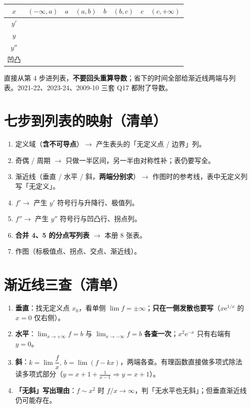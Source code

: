 \documentclass[11pt,a4paper]{ctexart}
\newcommand{\ee}{\mathrm{e}}
\begin{document}
\begin{center}
\footnotesize\setlength{\tabcolsep}{4pt}
\begin{tabular}{@{}c|ccccccc@{}}
$x$ & $(-\infty,a)$ & $a$ & $(a,b)$ & $b$ & $(b,c)$ & $c$ & $(c,+\infty)$ \\
\hline
$y'$ & & & & & & & \\
$y$ & & & & & & & \\
$y''$ & & & & & & & \\
凹凸 & & & & & & & \\
\end{tabular}
\end{center}

\begin{warnbox}[卷面附了 $y',y''$ 时]
直接从第 4 步进列表，\textbf{不要回头重算导数}；省下的时间全部给渐近线两端与列表。2021-22、2023-24、2009-10 三套 Q17 都附了导数。
\end{warnbox}

\section{七步到列表的映射（清单）}

\begin{enumerate}[label=\textbf{第 \arabic* 步},leftmargin=2.6em]
\item 定义域（\textbf{含不可导点}）$\to$ 产生表头的「无定义点 / 边界」列。
\item 奇偶 / 周期 $\to$ 只做一半区间，另一半由对称性补；表仍要写全。
\item 渐近线（垂直 / 水平 / 斜，\textbf{两端分别求}）$\to$ 作图时的参考线，表中无定义列写「无定义」。
\item $f'\to$ 产生 $y'$ 符号行与升降行、极值列。
\item $f''\to$ 产生 $y''$ 符号行与凹凸行、拐点列。
\item \textbf{合并 4、5 的分点写列表} $\to$ 本册 8 张表。
\item 作图（标极值点、拐点、交点、渐近线）。
\end{enumerate}

\section{渐近线三查（清单）}

\begin{enumerate}[label=\textbf{(\alph*)},leftmargin=2.1em]
\item \textbf{垂直}：找无定义点 $x_0$，看单侧 $\lim f=\pm\infty$；\textbf{只在一侧发散也要写}（$x\ee^{1/x}$ 的 $x=0$ 仅右侧）。
\item \textbf{水平}：$\lim_{x\to+\infty}f=b$ 与 $\lim_{x\to-\infty}f=b$ \textbf{各查一次}；$x^2\ee^{-x}$ 只有右端有 $y=0$。
\item \textbf{斜}：$k=\lim\dfrac{f}{x},\ b=\lim(f-kx)$，两端各查。有理函数直接做多项式除法读多项式部分（$y=x+1+\frac1{x-1}\Rightarrow y=x+1$）。
\item \textbf{「无斜」写出理由}：$f\sim x^2$ 时 $f/x\to\infty$，判「无水平也无斜」；但垂直渐近线仍可能存在。
\end{enumerate}
\end{document}
